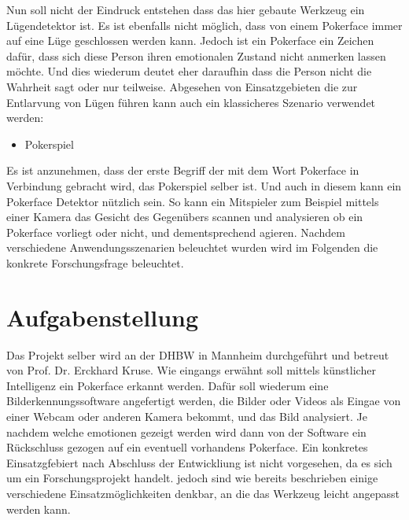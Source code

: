 \documentclass[12pt, a4paper]{scrbook}
\begin{document}
Nun soll nicht der Eindruck entstehen dass das hier gebaute Werkzeug ein Lügendetektor ist. Es ist ebenfalls nicht möglich, dass von einem Pokerface immer auf eine Lüge geschlossen werden kann. Jedoch ist ein Pokerface ein Zeichen dafür, dass sich diese Person ihren emotionalen Zustand nicht anmerken lassen möchte. Und dies wiederum deutet eher daraufhin dass die Person nicht die Wahrheit sagt oder nur teilweise. 
Abgesehen von Einsatzgebieten die zur Entlarvung von Lügen führen kann auch ein klassicheres Szenario verwendet werden:
\begin{itemize}
	\item{Pokerspiel}
\end{itemize}
Es ist anzunehmen, dass der erste Begriff der mit dem Wort Pokerface in Verbindung gebracht wird, das Pokerspiel selber ist. Und auch in diesem kann ein Pokerface Detektor nützlich sein. So kann ein Mitspieler zum Beispiel mittels einer Kamera das Gesicht des Gegenübers scannen und analysieren ob ein Pokerface vorliegt oder nicht, und dementsprechend agieren.
Nachdem verschiedene Anwendungsszenarien beleuchtet wurden wird im Folgenden die konkrete Forschungsfrage beleuchtet.
\section{Aufgabenstellung}
 Das Projekt selber wird an der DHBW in Mannheim durchgeführt und betreut von Prof. Dr. Erckhard Kruse.
 Wie eingangs erwähnt soll mittels künstlicher Intelligenz ein Pokerface erkannt werden. 
 Dafür soll wiederum eine Bilderkennungssoftware angefertigt werden, die Bilder oder Videos als Eingae von einer Webcam oder anderen Kamera bekommt, und das Bild analysiert. Je nachdem welche emotionen gezeigt werden wird dann von der Software ein Rückschluss gezogen auf ein eventuell vorhandens Pokerface. Ein konkretes Einsatzgfebiert nach Abschluss der Entwickliung ist nicht vorgesehen, da es sich um ein Forschungsprojekt handelt. jedoch sind wie bereits beschrieben einige verschiedene Einsatzmöglichkeiten denkbar, an die das Werkzeug leicht angepasst werden kann. 

\end{document}
